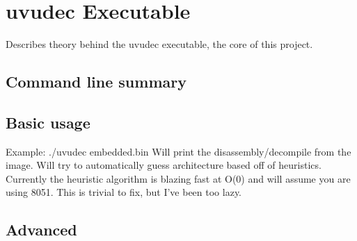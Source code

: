 \section{uvudec Executable}
Describes theory behind the uvudec executable, the core of this project.

\subsection{Command line summary}
\label{sec::uvudec::command_line}




% 

\subsection{Basic usage}
\label{sec::uvudec::basic_usage}

Example:
./uvudec embedded.bin
Will print the disassembly/decompile from the image.  
Will try to automatically guess architecture based off of heuristics.
Currently the heuristic algorithm is blazing fast at O(0) and will assume you are using 8051.
This is trivial to fix, but I've been too lazy.

\subsection{Advanced}
\label{sec::uvudec::advanced}
